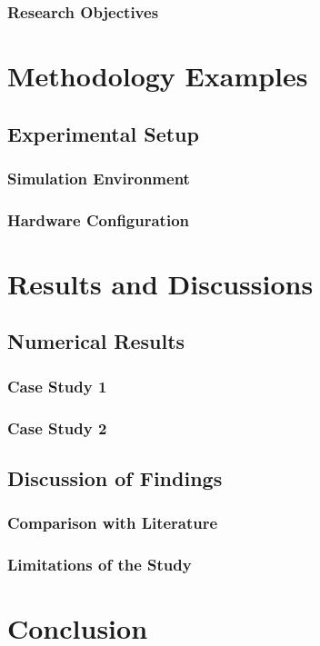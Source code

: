 \subsubsection{Research Objectives}

\section{Methodology Examples}
\lipsum[1]
\subsection{Experimental Setup}
\subsubsection{Simulation Environment}
\subsubsection{Hardware Configuration}

\section{Results and Discussions}
\lipsum[1]
\subsection{Numerical Results}
\lipsum[1]
\subsubsection{Case Study 1}
\lipsum[1]
\subsubsection{Case Study 2}
\lipsum[1]

\subsection{Discussion of Findings}
\lipsum[1]
\subsubsection{Comparison with Literature}
\lipsum[1]
\subsubsection{Limitations of the Study}
\lipsum[1]

\section{Conclusion }
\lipsum[1-3]
